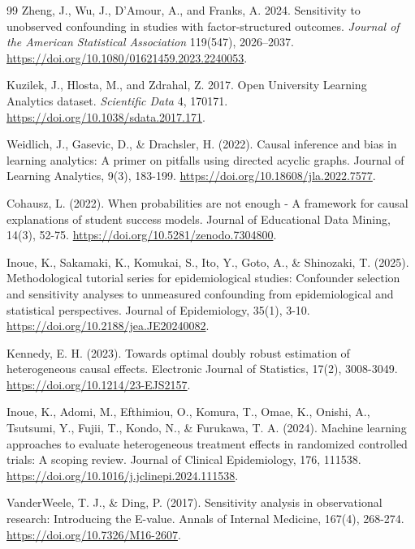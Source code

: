 \begin{thebibliography}{99}
Zheng, J., Wu, J., D'Amour, A., and Franks, A. 2024. Sensitivity to unobserved confounding in studies with factor-structured outcomes. \textit{Journal of the American Statistical Association} 119(547), 2026--2037. \url{https://doi.org/10.1080/01621459.2023.2240053}.

Kuzilek, J., Hlosta, M., and Zdrahal, Z. 2017. Open University Learning Analytics dataset. \textit{Scientific Data} 4, 170171. \url{https://doi.org/10.1038/sdata.2017.171}.

Weidlich, J., Gasevic, D., \& Drachsler, H. (2022). Causal inference and bias in learning analytics: A primer on pitfalls using directed acyclic graphs. Journal of Learning Analytics, 9(3), 183-199. \url{https://doi.org/10.18608/jla.2022.7577}.

Cohausz, L. (2022). When probabilities are not enough - A framework for causal explanations of student success models. Journal of Educational Data Mining, 14(3), 52-75. \url{https://doi.org/10.5281/zenodo.7304800}.

Inoue, K., Sakamaki, K., Komukai, S., Ito, Y., Goto, A., \& Shinozaki, T. (2025). Methodological tutorial series for epidemiological studies: Confounder selection and sensitivity analyses to unmeasured confounding from epidemiological and statistical perspectives. Journal of Epidemiology, 35(1), 3-10. \url{https://doi.org/10.2188/jea.JE20240082}.

Kennedy, E. H. (2023). Towards optimal doubly robust estimation of heterogeneous causal effects. Electronic Journal of Statistics, 17(2), 3008-3049. \url{https://doi.org/10.1214/23-EJS2157}.

Inoue, K., Adomi, M., Efthimiou, O., Komura, T., Omae, K., Onishi, A., Tsutsumi, Y., Fujii, T., Kondo, N., \& Furukawa, T. A. (2024). Machine learning approaches to evaluate heterogeneous treatment effects in randomized controlled trials: A scoping review. Journal of Clinical Epidemiology, 176, 111538. \url{https://doi.org/10.1016/j.jclinepi.2024.111538}.

VanderWeele, T. J., \& Ding, P. (2017). Sensitivity analysis in observational research: Introducing the E-value. Annals of Internal Medicine, 167(4), 268-274. \url{https://doi.org/10.7326/M16-2607}.
\end{thebibliography}
